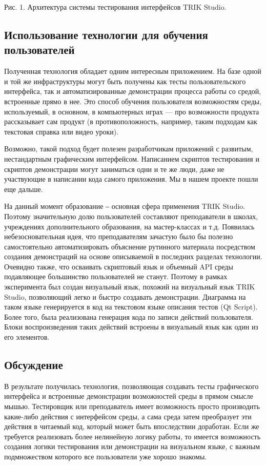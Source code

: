 ﻿\documentclass[conference]{IEEEtran}
\begin{document}
Рис. 1. Архитектура системы тестирования интерфейсов TRIK Studio.

\subsection{Использование технологии для обучения пользователей}
Полученная технология обладает одним интересным приложением. На базе одной и той же 
инфраструктуры могут быть получены как тесты пользовательского интерфейса, так и автоматизированные 
демонстрации процесса работы со средой, встроенные прямо в нее. Это способ обучения 
пользователя возможностям среды, используемый, в основном, в компьютерных играх --- про 
возможности продукта рассказывает сам продукт (в противоположность, например, таким 
подходам как текстовая справка или видео уроки).

Возможно, такой подход будет полезен разработчикам приложений с развитым, нестандартным 
графическим интерфейсом. Написанием скриптов тестирования и скриптов демонстрации 
могут заниматься одни и те же люди, даже не участвующие в написании кода самого приложения. 
Мы в нашем проекте пошли еще дальше.

На данный момент образование ‒ основная сфера применения TRIK Studio. Поэтому значительную 
долю пользователей составляют преподаватели в школах, учреждениях дополнительного образования, 
на мастер-классах и т.д. Появилась небезосновательная идея, что преподавателям зачастую 
было бы полезно самостоятельно автоматизировать объяснение рутинного материала посредством 
создания демонстраций на основе описываемой в последних разделах технологии. Очевидно 
также, что осваивать скриптовый язык и объемный API среды подавляющее большинство пользователей 
не станут. Поэтому в рамках эксперимента был создан визуальный язык, похожий на визуальный язык 
TRIK Studio, позволяющий легко и быстро создавать демонстрации. Диаграмма на таком 
языке генерируется в код на текстовом языке описания тестов (Qt Script). Более того, 
была реализована генерация кода по записи действий пользователя. Блоки воспроизведения 
таких действий встроены в визуальный язык как один из его элементов.

\subsection{Обсуждение}
В результате получилась технология, позволяющая создавать тесты графического интерфейса 
и встроенные демонстрации возможностей среды в прямом смысле мышью. Тестировщик или 
преподаватель имеет возможность просто производить какие-либо действия с интерфейсом 
среды, а сама среда затем преобразует эти действия в читаемый код, который может быть 
впоследствии  доработан. Если же требуется реализовать более нелинейную логику работы, 
то имеется возможность создания логики тестирования или демонстрации на визуальном 
языке, с важным подмножеством которого все пользователи уже хорошо знакомы.
\end{document}
